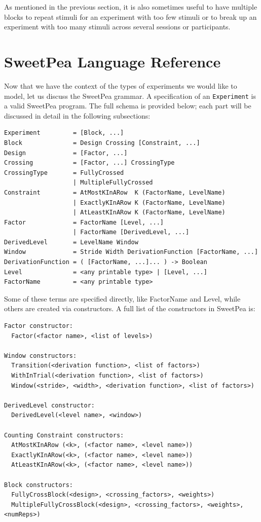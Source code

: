 As mentioned in the previous section, it is also sometimes useful to have multiple blocks to repeat stimuli for an experiment with too few stimuli or to break up an experiment with too many stimuli across several sessions or participants.

\section{SweetPea Language Reference}

Now that we have the context of the types of experiments we would like to model, let us discuss the SweetPea grammar. A specification of an \texttt{Experiment} is a valid SweetPea program. The full schema is provided below; each part will be discussed in detail in the following subsections:

\begin{verbatim}
Experiment         = [Block, ...]
Block              = Design Crossing [Constraint, ...]
Design             = [Factor, ...]
Crossing           = [Factor, ...] CrossingType
CrossingType       = FullyCrossed
                   | MultipleFullyCrossed
Constraint         = AtMostKInARow  K (FactorName, LevelName)
                   | ExactlyKInARow K (FactorName, LevelName)
                   | AtLeastKInARow K (FactorName, LevelName)
Factor             = FactorName [Level, ...]
                   | FactorName [DerivedLevel, ...]
DerivedLevel       = LevelName Window
Window             = Stride Width DerivationFunction [FactorName, ...]
DerivationFunction = ( [FactorName, ...]... ) -> Boolean
Level              = <any printable type> | [Level, ...]
FactorName         = <any printable type>
\end{verbatim}

Some of these terms are specified directly, like FactorName and Level, while others are created via constructors. A full list of the constructors in SweetPea is:

\begin{verbatim}
Factor constructor:
  Factor(<factor name>, <list of levels>)

Window constructors:
  Transition(<derivation function>, <list of factors>)
  WithInTrial(<derivation function>, <list of factors>)
  Window(<stride>, <width>, <derivation function>, <list of factors>)

DerivedLevel constructor:
  DerivedLevel(<level name>, <window>)

Counting Constraint constructors:
  AtMostKInARow (<k>, (<factor name>, <level name>))
  ExactlyKInARow(<k>, (<factor name>, <level name>))
  AtLeastKInARow(<k>, (<factor name>, <level name>))

Block constructors:
  FullyCrossBlock(<design>, <crossing_factors>, <weights>)
  MultipleFullyCrossBlock(<design>, <crossing_factors>, <weights>, <numReps>)
\end{verbatim}

